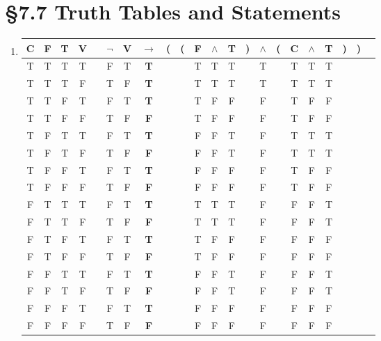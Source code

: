 % 
% 

\section{\S 7.7 Truth Tables and Statements}
\begin{enumerate}
    \item \begin{tabular}{@{ }c@{ }@{ }c@{ }@{ }c@{ }@{ }c | c@{ }@{ }c@{ }@{ }c@{ }@{ }c@{ }@{}c@{}@{}c@{}@{ }c@{ }@{ }c@{ }@{ }c@{ }@{}c@{}@{ }c@{ }@{}c@{}@{ }c@{ }@{ }c@{ }@{ }c@{ }@{}c@{}@{}c@{}@{ }c}
C & F & T & V &  & $\lnot$ & V & $\rightarrow$ & ( & ( & F & $\land$ & T & ) & $\land$ & ( & C & $\land$ & T & ) & ) & \\
\hline
T & T & T & T &  & F & T & \textbf{T} &  &  & T & T & T &  & T &  & T & T & T &  &  & \\
T & T & T & F &  & T & F & \textbf{T} &  &  & T & T & T &  & T &  & T & T & T &  &  & \\
T & T & F & T &  & F & T & \textbf{T} &  &  & T & F & F &  & F &  & T & F & F &  &  & \\
T & T & F & F &  & T & F & \textbf{F} &  &  & T & F & F &  & F &  & T & F & F &  &  & \\
T & F & T & T &  & F & T & \textbf{T} &  &  & F & F & T &  & F &  & T & T & T &  &  & \\
T & F & T & F &  & T & F & \textbf{F} &  &  & F & F & T &  & F &  & T & T & T &  &  & \\
T & F & F & T &  & F & T & \textbf{T} &  &  & F & F & F &  & F &  & T & F & F &  &  & \\
T & F & F & F &  & T & F & \textbf{F} &  &  & F & F & F &  & F &  & T & F & F &  &  & \\
F & T & T & T &  & F & T & \textbf{T} &  &  & T & T & T &  & F &  & F & F & T &  &  & \\
F & T & T & F &  & T & F & \textbf{F} &  &  & T & T & T &  & F &  & F & F & T &  &  & \\
F & T & F & T &  & F & T & \textbf{T} &  &  & T & F & F &  & F &  & F & F & F &  &  & \\
F & T & F & F &  & T & F & \textbf{F} &  &  & T & F & F &  & F &  & F & F & F &  &  & \\
F & F & T & T &  & F & T & \textbf{T} &  &  & F & F & T &  & F &  & F & F & T &  &  & \\
F & F & T & F &  & T & F & \textbf{F} &  &  & F & F & T &  & F &  & F & F & T &  &  & \\
F & F & F & T &  & F & T & \textbf{T} &  &  & F & F & F &  & F &  & F & F & F &  &  & \\
F & F & F & F &  & T & F & \textbf{F} &  &  & F & F & F &  & F &  & F & F & F &  &  & \\
\end{tabular}


\end{enumerate}
